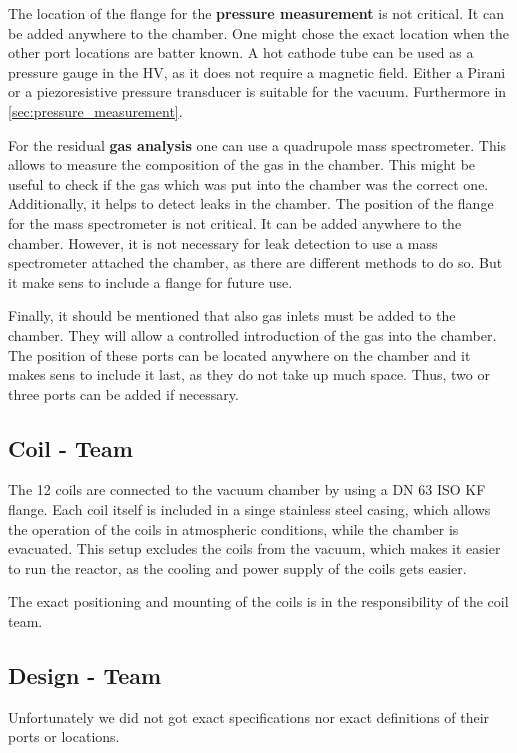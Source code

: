 The location of the flange for the \textbf{pressure measurement} is not critical.
It can be added anywhere to the chamber.
One might chose the exact location when the other port locations are batter known.
A hot cathode tube can be used as a pressure gauge in the HV, as it does not require a magnetic field.
Either a Pirani or a piezoresistive pressure transducer is suitable for the vacuum.
Furthermore in \autoref{sec:pressure_measurement}.

For the residual \textbf{gas analysis} one can use a quadrupole mass spectrometer.
This allows to measure the composition of the gas in the chamber.
This might be useful to check if the gas which was put into the chamber was the correct one.
Additionally, it helps to detect leaks in the chamber.
The position of the flange for the mass spectrometer is not critical.
It can be added anywhere to the chamber.
However, it is not necessary for leak detection to use a mass spectrometer attached the chamber, as there are different methods to do so.
But it make sens to include a flange for future use.

Finally, it should be mentioned that also gas inlets must be added to the chamber.
They will allow a controlled introduction of the gas into the chamber.
The position of these ports can be located anywhere on the chamber and it makes sens to include it last, as they do not take up much space.
Thus, two or three ports can be added if necessary.


\subsection{Coil - Team}


The 12 coils are connected to the vacuum chamber by using a DN 63 ISO KF flange.
Each coil itself is included in a singe stainless steel casing, which allows the operation of the coils in atmospheric conditions, while the chamber is evacuated.
This setup excludes the coils from the vacuum, which makes it easier to run the reactor, as the cooling and power supply of the coils gets easier.

The exact positioning and mounting of the coils is in the responsibility of the coil team.



\subsection{Design - Team}
%
Unfortunately we did not got exact specifications nor exact definitions of their ports or locations.

